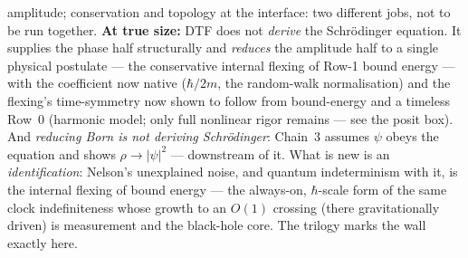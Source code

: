 \documentclass[11pt]{article}
\begin{document}
amplitude; conservation and topology at the interface: two different jobs, not to be run together.
\smallskip
\noindent\textbf{At true size:} DTF does not \emph{derive} the Schr\"odinger equation. It supplies the
phase half structurally and \emph{reduces} the amplitude half to a single physical postulate --- the
conservative internal flexing of Row-1 bound energy --- with the coefficient now native ($\hbar/2m$, the
random-walk normalisation) and the flexing's time-symmetry now shown to follow from bound-energy and a
timeless Row~0 (harmonic model; only full nonlinear rigor remains --- see the posit box). And \emph{reducing Born
is not deriving Schr\"odinger}: Chain~3 assumes $\psi$ obeys the equation and shows $\rho\to|\psi|^2$ ---
downstream of it. What is new is an \emph{identification}: Nelson's unexplained noise, and quantum
indeterminism with it, is the internal flexing of bound energy --- the always-on, $\hbar$-scale form of the
same clock indefiniteness whose growth to an $O(1)$ crossing (there gravitationally driven) is measurement
and the black-hole core. The trilogy marks the wall exactly here.
\end{document}
